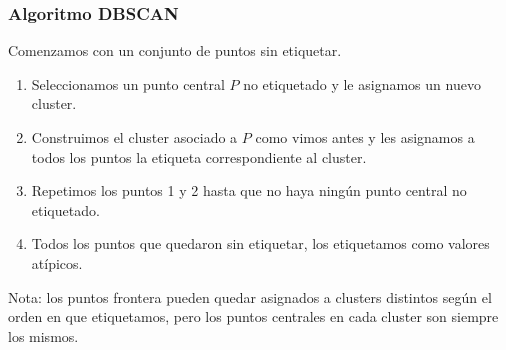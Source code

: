 \documentclass[aspectratio=169,12pt]{beamer}
\begin{document}


\begin{frame}
\frametitle{Algoritmo DBSCAN}

Comenzamos con un conjunto de puntos sin etiquetar.

\begin{enumerate}
\item Seleccionamos un punto central $P$ no etiquetado y le asignamos un nuevo cluster.
\item Construimos el cluster asociado a $P$ como vimos antes y les asignamos a todos los puntos la etiqueta correspondiente al cluster.
\item Repetimos los puntos 1 y 2 hasta que no haya ningún punto central no etiquetado.
\item Todos los puntos que quedaron sin etiquetar, los etiquetamos como valores atípicos.
\end{enumerate}

Nota: los puntos frontera pueden quedar asignados a clusters distintos según el orden en que etiquetamos, pero los puntos centrales en cada cluster son siempre los mismos.

\end{frame}
\end{document}
